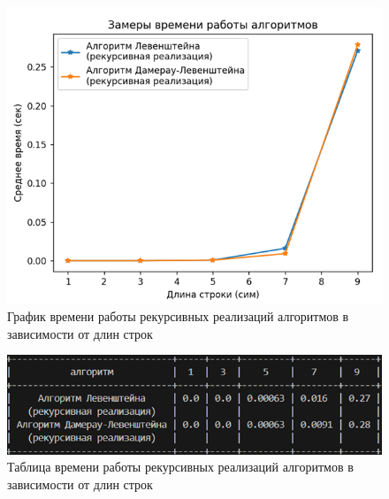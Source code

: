 \documentclass[a4paper,12pt]{article}
\begin{document}
\begin{figure}[H]
    \centering
    \includegraphics[width=1\textwidth]{graph_rec.png}
    \caption{График времени работы рекурсивных реализаций алгоритмов в зависимости от длин строк}
\end{figure}
\begin{figure}[H]
    \centering
    \includegraphics[width=1\textwidth]{table_rec.png}
    \caption{Таблица времени работы рекурсивных реализаций алгоритмов в зависимости от длин строк}
\end{figure}
\end{document}
